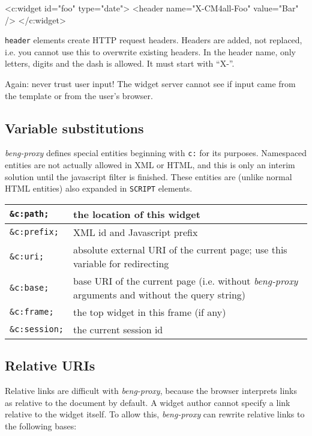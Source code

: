 \documentclass[a4paper,12pt]{article}
\begin{document}
\begin{verbatim*}
<c:widget id="foo" type="date">
  <header name="X-CM4all-Foo" value="Bar" />
</c:widget>
\end{verbatim*}

\texttt{header} elements create HTTP request headers.  Headers are
added, not replaced, i.e. you cannot use this to overwrite existing
headers.  In the header name, only letters, digits and the dash is
allowed.  It must start with ``X-''.

Again: never trust user input!  The widget server cannot see if input
came from the template or from the user's browser.

\subsection{Variable substitutions}

\emph{beng-proxy} defines special entities beginning with \texttt{c:}
for its purposes.  Namespaced entities are not actually allowed in XML
or HTML, and this is only an interim solution until the javascript
filter is finished.  These entities are (unlike normal HTML entities)
also expanded in \texttt{SCRIPT} elements.

\begin{tabular}{|l|p{8cm}|}
\hline
\texttt{\&c:path;} & the location of this widget \\
\hline
\texttt{\&c:prefix;} & XML id and Javascript prefix \\
\hline
\texttt{\&c:uri;} & absolute external URI of the current page; use
this variable for redirecting \\
\hline

\texttt{\&c:base;} & base URI of the current page (i.e. without
\emph{beng-proxy} arguments and without the query string) \\

\hline
\texttt{\&c:frame;} & the top widget in this frame (if any) \\
\hline
\texttt{\&c:session;} & the current session id \\
\hline
\end{tabular}

\subsection{Relative URIs}

Relative links are difficult with \emph{beng-proxy}, because the
browser interprets links as relative to the document by default.  A
widget author cannot specify a link relative to the widget itself.  To
allow this, \emph{beng-proxy} can rewrite relative links to the
following bases:
\end{document}

